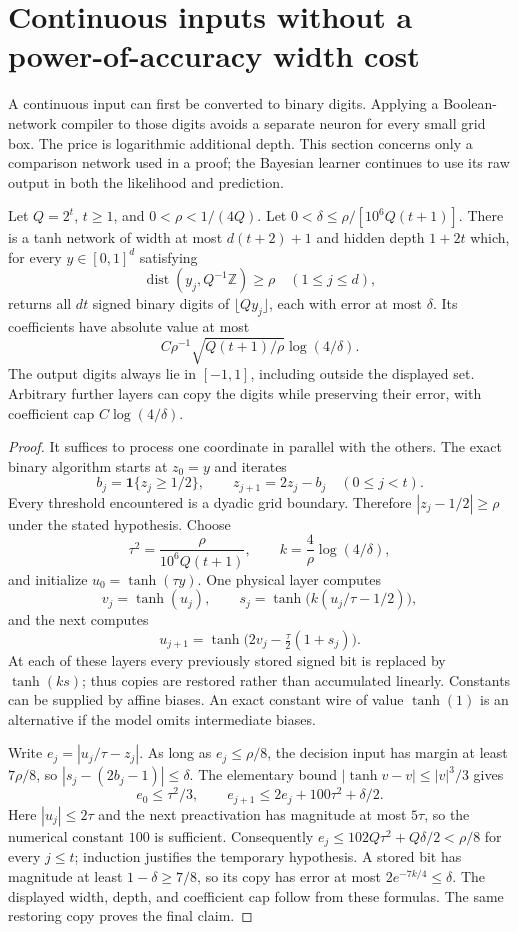 \section{Continuous inputs without a power-of-accuracy width cost}
\label{sec:quantized-input}
A continuous input can first be converted to binary digits.  Applying a
Boolean-network compiler to those digits avoids a separate neuron for every
small grid box.  The price is logarithmic additional depth.  This section
concerns only a comparison network used in a proof; the Bayesian learner
continues to use its raw output in both the likelihood and prediction.

\begin{lemma}\label{lem:tanh-quantizer}
Let $Q=2^t$, $t\ge1$, and $0<\rho<1/(4Q)$.  Let
$0<\delta\le\rho/[10^6Q(t+1)]$.  There is a tanh network of width at most
$d(t+2)+1$ and hidden depth $1+2t$ which, for every
$y\in[0,1]^d$ satisfying
\[
 \operatorname{dist}(y_j,Q^{-1}\mathbb Z)\ge\rho
 \quad(1\le j\le d),
\]
returns all $dt$ signed binary digits of $\lfloor Qy_j\rfloor$, each with
error at most $\delta$.  Its coefficients have absolute value at most
\[
 C\rho^{-1}\sqrt{Q(t+1)/\rho}\log(4/\delta).
\]
The output digits always lie in $[-1,1]$, including outside the displayed
set.  Arbitrary further layers can copy the digits while preserving their
error, with coefficient cap $C\log(4/\delta)$.
\end{lemma}
\begin{proof}
It suffices to process one coordinate in parallel with the others.  The
exact binary algorithm starts at $z_0=y$ and iterates
\[
 b_j=\mathbf 1\{z_j\ge1/2\},\qquad z_{j+1}=2z_j-b_j
 \quad(0\le j<t).
\]
Every threshold encountered is a dyadic grid boundary.  Therefore
$|z_j-1/2|\ge\rho$ under the stated hypothesis.  Choose
\[
 \tau^2=\frac{\rho}{10^6Q(t+1)},\qquad
 k=\frac4\rho\log(4/\delta),
\]
and initialize $u_0=\tanh(\tau y)$.  One physical layer computes
\[
 v_j=\tanh(u_j),\qquad
 s_j=\tanh\big(k(u_j/\tau-1/2)\big),
\]
and the next computes
\[
 u_{j+1}=\tanh\big(2v_j-\tfrac\tau2(1+s_j)\big).
\]
At each of these layers every previously stored signed bit is replaced by
$\tanh(k s)$; thus copies are restored rather than accumulated linearly.
Constants can be supplied by affine biases.  An exact constant wire of value
$\tanh(1)$ is an alternative if the model omits intermediate biases.

Write $e_j=|u_j/\tau-z_j|$.  As long as $e_j\le\rho/8$, the decision
input has margin at least $7\rho/8$, so
$|s_j-(2b_j-1)|\le\delta$.  The elementary bound
$|\tanh v-v|\le |v|^3/3$ gives
\[
 e_0\le\tau^2/3,\qquad
 e_{j+1}\le2e_j+100\tau^2+\delta/2.
\]
Here $|u_j|\le2\tau$ and the next preactivation has magnitude at most
$5\tau$, so the numerical constant $100$ is sufficient.  Consequently
$e_j\le102Q\tau^2+Q\delta/2<\rho/8$ for every $j\le t$;
induction justifies the temporary hypothesis.  A stored bit has magnitude
at least $1-\delta\ge7/8$, so its copy has error at most
$2e^{-7k/4}\le\delta$.  The displayed width, depth, and coefficient cap
follow from these formulas.  The same restoring copy proves the final claim.
\end{proof}


